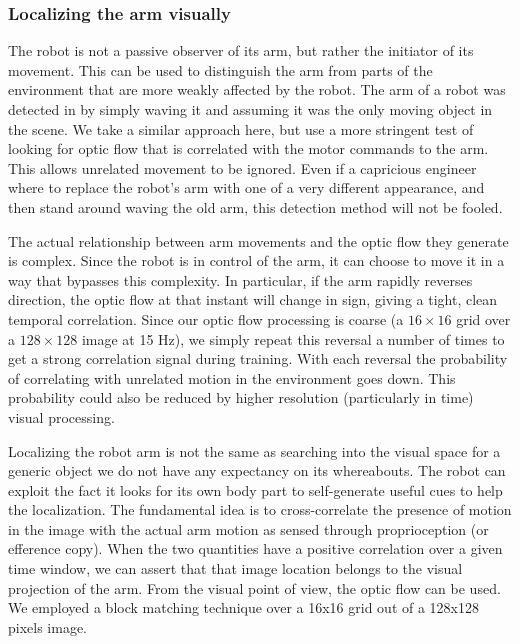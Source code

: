 \subsubsection*{Localizing the arm visually}

The robot is not a passive observer of its arm, but rather the
initiator of its movement.  This can be used to distinguish the arm
from parts of the environment that are more weakly affected by the
robot.  The arm of a robot was detected in \cite{Marjanovic-96-SAB} by
simply waving it and assuming it was the only moving object in the
scene.  We take a similar approach here, but use a more
stringent test of looking for optic flow that is correlated with
the motor commands to the arm.  This allows unrelated movement
to be ignored.  Even if a capricious engineer where to 
replace the robot's arm with one of a very different appearance,
and then stand around waving the old arm, this detection method
will not be fooled.  

The actual relationship between arm movements and the optic flow they
generate is complex.  Since the robot is in control of the arm, it can
choose to move it in a way that bypasses this complexity.  In
particular, if the arm rapidly reverses direction, the optic flow at
that instant will change in sign, giving a tight, clean temporal
correlation.  Since our optic flow processing is coarse (a $16\times
16$ grid over a $128\times 128$ image at 15 Hz), we simply repeat this
reversal a number of times to get a strong correlation signal during
training.  With each reversal the probability of correlating with
unrelated motion in the environment goes down.  This probability could
also be reduced by higher resolution (particularly in time) visual
processing.

\ifverbose
Localizing the robot arm is not the same as searching into the visual
space for a generic object we do not have any expectancy on its
whereabouts. The robot can exploit the fact it looks for its own body
part to self-generate useful cues to help the localization. The
fundamental idea is to cross-correlate the presence of motion in the
image with the actual arm motion as sensed through proprioception (or
efference copy). When the two quantities have a positive correlation
over a given time window, we can assert that that image location
belongs to the visual projection of the arm. From the visual point of
view, the optic flow can be used. We employed a block matching
technique over a 16x16 grid out of a 128x128 pixels image.
\fi

